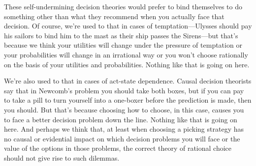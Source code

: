 \documentclass[a4paper]{article}
\newenvironment{CCM rewritten}
{\begingroup\color{blue}} %
{\endgroup}              %
\begin{document}


These self-undermining decision theories would prefer to bind themselves to do something other than what they recommend when you actually face that decision.
Of course, we're used to that in cases of temptation---Ulysses should pay his sailors to bind him to the mast as their ship passes the Sirens---but that's because we think your utilities will change under the pressure of temptation or your probabilities will change in an irrational way or you won't choose rationally on the basis of your utilities and probabilities. Nothing like that is going on here.

We're also used to that in cases of act-state dependence. Causal decision theorists say that in Newcomb's problem you should take both boxes, but if you can pay to take a pill to turn yourself into a one-boxer before the prediction is made, then you should. But that's because choosing how to choose, in this case, causes you to face a better decision problem down the line. Nothing like that is going on here. And perhaps we think that, at least when choosing a picking strategy has no causal or evidential impact on which decision problems you will face or the value of the options in those problems, the correct theory of rational choice should not give rise to such dilemmas.
\end{document}
